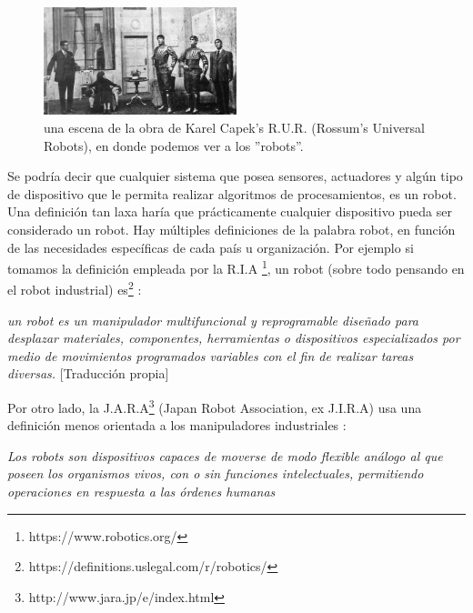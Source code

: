 \begin{figure}[htb]
  \begin{center}
    \includegraphics[width=0.5\textwidth]{figuras/Capek_play.jpg}
    \caption[Caption for LOF]{una escena de la obra de Karel Capek's R.U.R. (Rossum's Universal Robots), en donde podemos ver a los ''robots''.}
       
    \label{fig:reprap }
  \end{center}
\end{figure}

Se podría decir que cualquier sistema que posea sensores, actuadores y algún tipo de dispositivo que le permita realizar algoritmos de procesamientos, es un robot. Una definición tan laxa haría que prácticamente cualquier dispositivo pueda ser considerado un robot. Hay múltiples definiciones de la palabra robot, en función de las necesidades específicas de cada país u organización. Por ejemplo si tomamos la definición empleada por la R.I.A \footnote{https://www.robotics.org/}, un robot (sobre todo pensando en el robot industrial) es\footnote{https://definitions.uslegal.com/r/robotics/} : 
  

\begin{center}
\textit{un robot es un manipulador multifuncional y reprogramable diseñado para desplazar materiales, componentes, herramientas o dispositivos especializados por medio de movimientos programados variables con el fin de realizar tareas diversas.} [Traducción propia]
\end{center}

Por otro lado, la J.A.R.A\footnote{http://www.jara.jp/e/index.html} (Japan Robot Association, ex J.I.R.A) usa una definición menos orientada a los manipuladores industriales \citep{reyes_cortes_robotica:_2011}:

\begin{center}
\textit{Los robots son dispositivos capaces de moverse de modo flexible análogo al que poseen los organismos vivos, con o sin funciones intelectuales, permitiendo operaciones en respuesta a las órdenes humanas}
\end{center}

